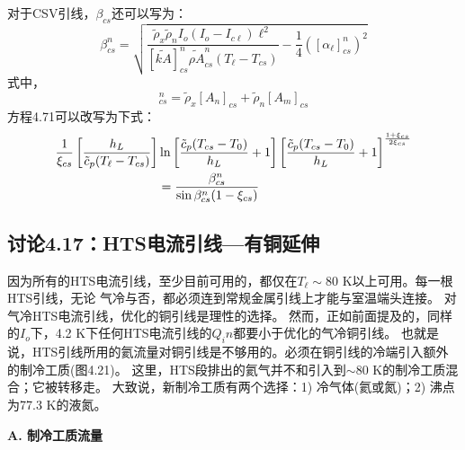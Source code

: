 对于CSV引线，$\beta_{cs}$还可以写为：
\begin{equation}%
\beta_{cs}^{n}=\sqrt{\frac{\tilde{\rho}_x\tilde{\rho}_nI_o(I_o-I_{c\ell})\ell^2}{[\tilde{kA}]_{cs}^{n}\tilde{\rho A}_{cs}^{n}(T_\ell-T_{cs})}-\frac{1}{4}([\alpha_\ell]_{cs}^{n})^2}
\end{equation}
式中，
\begin{equation}%
[\tilde{\rho A}]_{cs}^{n}=\tilde{\rho}_x[A_n]_{cs}+\tilde{\rho}_n[A_m]_{cs}
\end{equation}
方程4.71可以改写为下式：
\begin{align}%
\frac{1}{\xi_{cs}}\left[\frac{h_L}{\tilde{c}_p(T_\ell-T_{cs})}\right]&\ln\left[\frac{\tilde{c}_p(T_{cs}-T_0)}{h_L}+1\right]\left[\frac{\tilde{c}_p(T_{cs}-T_0)}{h_L}+1\right]^{\frac{1+\xi_{cs}}{2\xi_{cs}}}\\
&=\frac{\beta_{cs}^{n}}{\sin\beta_{cs}^{n}(1-\xi_{cs})}\notag
\end{align}



\subsection{讨论4.17：HTS电流引线---有铜延伸}
因为所有的HTS电流引线，至少目前可用的，都仅在$T_\ell\sim$80 K以上可用。每一根HTS引线，无论
气冷与否，都必须连到常规金属引线上才能与室温端头连接。
对气冷HTS电流引线，优化的铜引线是理性的选择。
然而，正如前面提及的，同样的$I_o$下，4.2 K下任何HTS电流引线的$Q_in$都要小于优化的气冷铜引线。 
也就是说，HTS引线所用的氦流量对铜引线是不够用的。必须在铜引线的冷端引入额外的制冷工质(图4.21)。
这里，HTS段排出的氦气并不和引入到$\sim$80 K的制冷工质混合；它被转移走。 
大致说，新制冷工质有两个选择：1) 冷气体(氦或氮)；2) 沸点为77.3 K的液氮。

\textbf{A. 制冷工质流量}

